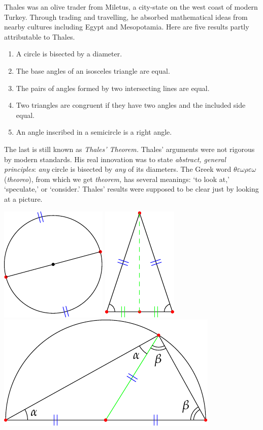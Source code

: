 Thales was an olive trader from Miletus, a city-state on the west coast of modern Turkey. Through trading and travelling, he absorbed mathematical ideas from nearby cultures including Egypt and Mesopotamia. Here are five results partly attributable to Thales.

\begin{enumerate}\itemsep0pt
  \item A circle is bisected by a diameter.
  \item The base angles of an isosceles triangle are equal.
  \item The pairs of angles formed by two intersecting lines are equal.
  \item Two triangles are congruent if they have two angles and the included side equal.
  \item An angle inscribed in a semicircle is a right angle.
\end{enumerate}
The last is still known as \emph{Thales' Theorem.} Thales' arguments were not rigorous by modern standards. His real innovation was to state \emph{abstract, general principles}: \emph{any} circle is bisected by \emph{any} of its diameters. The Greek word $\theta\varepsilon\omega\rho\varepsilon\omega$ (\emph{theoreo}), from which we get \emph{theorem,} has several meanings: `to look at,' `speculate,' or `consider.' Thales' results were supposed to be clear just by looking at a picture.
\begin{center}
	\includegraphics[scale=0.9]{thales-1}
	\qquad\qquad
	\includegraphics[scale=0.9]{thales-2}
	\qquad\qquad
	\includegraphics[scale=0.9]{thales-5}\label{thm:thales}
\end{center}
